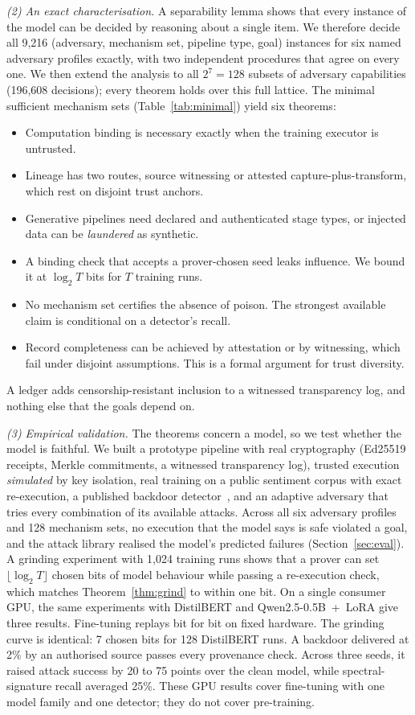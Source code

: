 \emph{(2) An exact characterisation.} A separability lemma shows that every instance of the
model can be decided by reasoning about a single item. We therefore decide all 9,216
(adversary, mechanism set, pipeline type, goal) instances for six named adversary profiles
exactly, with two independent procedures that agree on every one. We then extend the
analysis to all $2^7=128$ subsets of adversary capabilities (196,608 decisions); every
theorem holds over this full lattice. The minimal sufficient mechanism sets
(Table~\ref{tab:minimal}) yield six theorems:
\begin{itemize}
\item Computation binding is necessary exactly when the training executor is untrusted.
\item Lineage has two routes, source witnessing or attested capture-plus-transform, which
  rest on disjoint trust anchors.
\item Generative pipelines need declared and authenticated stage types, or injected data can
  be \emph{laundered} as synthetic.
\item A binding check that accepts a prover-chosen seed leaks influence. We bound it at
  $\log_2T$ bits for $T$ training runs.
\item No mechanism set certifies the absence of poison. The strongest available claim is
  conditional on a detector's recall.
\item Record completeness can be achieved by attestation or by witnessing, which fail under
  disjoint assumptions. This is a formal argument for trust diversity.
\end{itemize}
A ledger adds censorship-resistant inclusion to a witnessed transparency log, and nothing
else that the goals depend on.

\emph{(3) Empirical validation.} The theorems concern a model, so we test whether the model
is faithful. We built a prototype pipeline with real cryptography (Ed25519 receipts, Merkle
commitments, a witnessed transparency log), trusted execution \emph{simulated} by key
isolation, real training on a public sentiment corpus with
exact re-execution, a published backdoor detector~\cite{tran2018spectral}, and an adaptive
adversary that tries every combination of its available attacks. Across all six adversary
profiles and 128 mechanism sets, no execution that the model says is safe violated a goal,
and the attack library realised the model's predicted failures (Section~\ref{sec:eval}). A
grinding experiment with 1,024 training runs shows that a prover can set
$\lfloor\log_2T\rfloor$ chosen bits of model behaviour while passing a re-execution check,
which matches Theorem~\ref{thm:grind} to within one bit. On a single consumer GPU, the same experiments with DistilBERT and Qwen2.5-0.5B~+~LoRA give
three results. Fine-tuning replays bit for bit on fixed hardware. The grinding curve is
identical: 7 chosen bits for 128 DistilBERT runs. A backdoor delivered at 2\% by an authorised source passes every provenance check.
Across three seeds, it raised attack success by 20 to 75 points over the clean model, while
spectral-signature recall averaged 25\%. These GPU results cover fine-tuning with one model
family and one detector; they do not cover pre-training.

